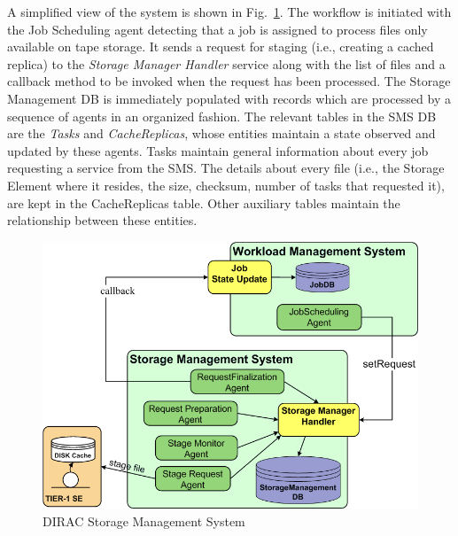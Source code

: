 \documentclass[10pt,conference]{IEEEtran}
\begin{document}
A simplified view of the system is shown in  Fig.~\ref{fig:DIRAC-SMS}. The workflow is initiated
with the Job Scheduling agent detecting that a job is assigned to process files
only available on tape storage. It sends a request for staging (i.e., creating a
cached replica) to the \textit{Storage Manager Handler} service along with the
list of files and a callback method to be invoked when the request has been
processed. The Storage Management DB is immediately populated with records which
are processed by a sequence of agents in an organized fashion. The relevant
tables in the SMS DB are the \textit{Tasks} and \textit{CacheReplicas}, whose
entities maintain a state observed and updated by these agents. Tasks maintain
general information about every job requesting a service from the SMS. The
details about every file (i.e., the Storage Element where it resides, the
size, checksum, number of tasks that requested it), are kept in the CacheReplicas
table. Other auxiliary tables maintain the relationship between these entities.
\begin{figure}[t]
\includegraphics[width=0.9\linewidth,keepaspectratio=true]{./SMS_simplified.png}
\centering
\caption{DIRAC Storage Management System}
\label{fig:DIRAC-SMS}
\end{figure}
\end{document}
